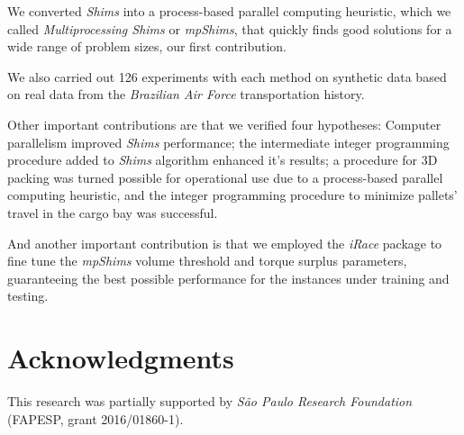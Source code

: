 \documentclass[preprint,authoryear]{elsarticle}
\begin{document}
We converted {\it Shims} into a process-based parallel computing heuristic, which we called {\it Multiprocessing Shims} or {\it mpShims}, that quickly finds good solutions for a wide range of problem sizes, our first contribution.

We also carried out 126 experiments with each method on synthetic data based on real data from the {\it Brazilian Air Force} transportation history.

Other important contributions are that we verified four hypotheses: Computer parallelism improved {\it Shims} performance; the intermediate integer programming procedure added to {\it Shims} algorithm enhanced it's results; a procedure for 3D packing was turned possible for operational use due to a process-based parallel computing heuristic, and the integer programming procedure to minimize pallets' travel in the cargo bay was successful.

And another important contribution is that we employed the {\it iRace} package to fine tune the {\it mpShims} volume threshold and torque surplus parameters, guaranteeing the best possible performance for the instances under training and testing.

\section*{Acknowledgments}

This research was partially supported by \textit{São Paulo Research Foundation} (FAPESP, grant 2016/01860-1).




\end{document}
